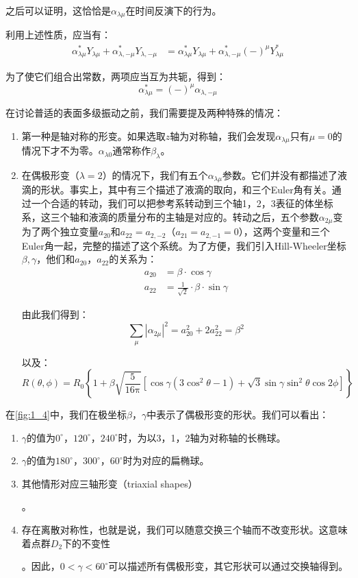 之后可以证明，这恰恰是$\alpha_{\lambda\mu}$在时间反演下的行为。
\begin{booknote*}
利用上述性质，应当有：
\begin{align*}
\alpha^{*}_{\lambda\mu}Y_{\lambda\mu}+\alpha^{*}_{\lambda,-\mu}Y_{\lambda,-\mu} & =\alpha^{*}_{\lambda\mu}Y_{\lambda\mu}+\alpha^{*}_{\lambda,-\mu}(-)^{\mu}Y^{*}_{\lambda\mu}
\end{align*}

为了使它们组合出常数，两项应当互为共轭，得到：
\[
\alpha^{*}_{\lambda\mu}=(-)^{\mu}\alpha_{\lambda,-\mu}
\]
\end{booknote*}
在讨论普适的表面多级振动之前，我们需要提及两种特殊的情况：
\begin{enumerate}
\item 第一种是轴对称的形变。如果选取$z$轴为对称轴，我们会发现$\alpha_{\lambda\mu}$只有$\mu=0$的情况下才不为零。$\alpha_{\lambda0}$通常称作$\beta_{\lambda}$。
\item 在偶极形变（$\lambda=2$）的情况下，我们有五个$\alpha_{\lambda\mu}$参数。它们并没有都描述了液滴的形状。事实上，其中有三个描述了液滴的取向，和三个Euler角有关。通过一个合适的转动，我们可以把参考系转动到三个轴1，2，3表征的体坐标系，这三个轴和液滴的质量分布的主轴是对应的。转动之后，五个参数$\alpha_{2\mu}$变为了两个独立变量$a_{20}$和$a_{22}=a_{2,-2}$（$a_{21}=a_{2,-1}=0$），这两个变量和三个Euler角一起，完整的描述了这个系统。为了方便，我们引入Hill-Wheeler坐标$\beta,\gamma$，他们和$a_{20}$，$a_{22}$的关系为：
\begin{align*}
a_{20} & =\beta\cdot\cos\gamma\\
a_{22} & =\frac{1}{\sqrt{2}}\cdot\beta\cdot\sin\gamma
\end{align*}

由此我们得到：
\[
\sum_{\mu}\left|\alpha_{2\mu}\right|^{2}=a^{2}_{20}+2a^{2}_{22}=\beta^{2}
\]

以及：
\[
R(\theta,\phi)=R_{0}\left\{ 1+\beta\sqrt{\frac{5}{16\mathrm{\pi}}}[\cos\gamma(3\cos^{2}\theta-1)+\sqrt{3}\sin\gamma\sin^{2}\theta\cos2\phi]\right\} 
\]

\end{enumerate}
在\ref{fig:1_4}中，我们在极坐标$\beta$，$\gamma$中表示了偶极形变的形状。我们可以看出：
\begin{enumerate}
\item $\gamma$的值为$0^{\circ}$，$120^{\circ}$，$240^{\circ}$时，为以3，1，2轴为对称轴的长椭球。
\item $\gamma$的值为$180^{\circ}$，$300^{\circ}$，$60^{\circ}$时为对应的扁椭球。
\item 其他情形对应三轴形变（triaxial shapes）

。
\item 存在离散对称性，也就是说，我们可以随意交换三个轴而不改变形状。这意味着点群$D_{2}$下的不变性

。因此，$0<\gamma<60^{\circ}$可以描述所有偶极形变，其它形状可以通过交换轴得到。
\end{enumerate}
